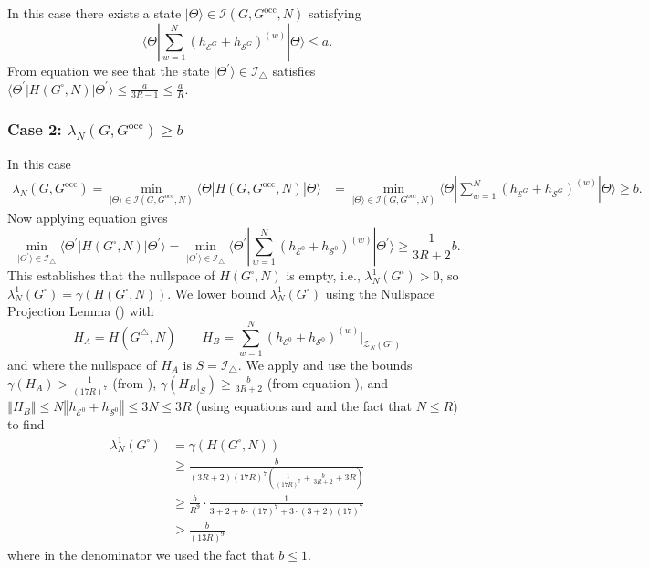 \documentclass[../thesis-main/thesis-main]{subfiles}
\begin{document}
In this case there exists a state $|\Theta\rangle\in\mathcal{I}(G,G^{\text{occ}},N)$ satisfying 
\[
\langle\Theta|\sum_{w=1}^{N}\left(h_{\mathcal{E}^{G}}+h_{\mathcal{S}^{G}}\right)^{(w)}|\Theta\rangle\leq a.
\]
From equation  we see that the state $|\Theta^{\prime}\rangle\in\mathcal{I}_{\triangle}$ satisfies $\langle\Theta^{\prime}|H(G^{\square},N)|\Theta^{\prime}\rangle\leq\frac{a}{3R-1}\leq\frac{a}{R}$. 

\subsubsection*{Case 2: $\lambda_{N}(G,G^{\text{occ}})\geq b$}

In this case 
\begin{align*}
\lambda_{N}(G,G^{\text{occ}})=\min_{|\Theta\rangle\in\mathcal{I}(G,G^{\text{occ}},N)}\langle\Theta|H(G,G^{\text{occ}},N)|\Theta\rangle & = \min_{|\Theta\rangle\in\mathcal{I}(G,G^{\text{occ}},N)}\langle\Theta|\sum_{w=1}^{N}\left(h_{\mathcal{E}^{G}}+h_{\mathcal{S}^{G}}\right)^{(w)}|\Theta\rangle\geq b.
\end{align*}
 Now applying equation  gives
\begin{equation}
\min_{|\Theta^{\prime}\rangle\in\mathcal{I}_{\triangle}}\langle\Theta^{\prime}|H(G^{\square},N)|\Theta^{\prime}\rangle=\min_{|\Theta^{\prime}\rangle\in\mathcal{I}_{\triangle}}\langle\Theta^{\prime}|\sum_{w=1}^{N}\left(h_{\mathcal{E}^{0}}+h_{\mathcal{S}^{0}}\right)^{(w)}|\Theta^{\prime}\rangle\geq\frac{1}{3R+2}b.\label{eq:bound_thetaprime}
\end{equation}
This establishes that the nullspace of $H(G^{\square},N)$ is empty, i.e., $\lambda_{N}^{1}(G^{\square})>0$, so $\lambda_{N}^{1}(G^{\square})=\gamma(H(G^{\square},N))$. We lower bound $\lambda_{N}^{1}(G^{\square})$ using the Nullspace Projection Lemma () with
\[
H_{A}=H(G^{\triangle},N)\qquad H_{B}=\sum_{w=1}^{N}\left(h_{\mathcal{E}^{0}}+h_{\mathcal{S}^{0}}\right)^{(w)}\bigg|_{\mathcal{Z}_{N}(G^{\square})}
\]
and where the nullspace of $H_{A}$ is $S=\mathcal{I}_{\triangle}$. We apply  and use the bounds $\gamma(H_{A})>\frac{1}{\left(17R\right)^{7}}$ (from ), $\gamma(H_{B}|_{S})\geq\frac{b}{3R+2}$ (from equation ), and $\left\Vert H_{B}\right\Vert \leq N\left\Vert {h_{\mathcal{E}^{0}}+h_{\mathcal{S}^{0}}}\right\Vert \leq3N\leq3R$ (using equations  and  and the fact that $N\leq R$) to find 
\begin{align*}
\lambda_{N}^{1}(G^{\square}) &= \gamma(H(G^{\square},N)) \\
 &\geq \frac{b}{(3R+2)(17R)^7(\frac{1}{(17R)^{7}}+\frac{b}{3R+2}+3R)} \\
 & \geq\frac{b}{R^{9}} \cdot \frac{1}{3+2+b\cdot(17)^{7}+3\cdot\left(3+2\right)(17)^{7}} \\
 & >\frac{b}{(13R)^{9}}
\end{align*}
where in the denominator we used the fact that $b\leq1$.
\end{document}
